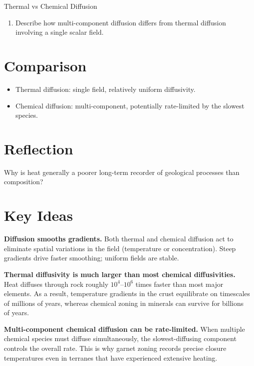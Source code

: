 \begin{activity}{Thermal vs Chemical Diffusion}
\begin{enumerate}
  \item Describe how multi-component diffusion differs from thermal diffusion involving a single scalar field.
  \answerbox[3cm]
\end{enumerate}

\section*{Comparison}
\begin{itemize}
  \item Thermal diffusion: single field, relatively uniform diffusivity.
  \item Chemical diffusion: multi-component, potentially rate-limited by the slowest species.
\end{itemize}

\section*{Reflection}
Why is heat generally a poorer long-term recorder of geological processes than composition?

\answerbox[3cm]

{\color{red}
\section*{Key Ideas}

\textbf{Diffusion smooths gradients.} Both thermal and chemical diffusion act to eliminate spatial variations in the field (temperature or concentration). Steep gradients drive faster smoothing; uniform fields are stable.

\textbf{Thermal diffusivity is much larger than most chemical diffusivities.} Heat diffuses through rock roughly $10^4$--$10^6$ times faster than most major elements. As a result, temperature gradients in the crust equilibrate on timescales of millions of years, whereas chemical zoning in minerals can survive for billions of years.

\textbf{Multi-component chemical diffusion can be rate-limited.} When multiple chemical species must diffuse simultaneously, the slowest-diffusing component controls the overall rate. This is why garnet zoning records precise closure temperatures even in terranes that have experienced extensive heating.
}

\end{activity}